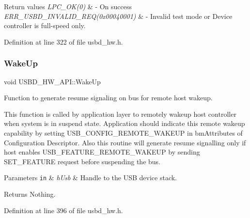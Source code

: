 \begin{DoxyRetVals}{Return values}
{\em L\+P\+C\+\_\+\+O\+K(0)} & -\/ On success \\
\hline
{\em E\+R\+R\+\_\+\+U\+S\+B\+D\+\_\+\+I\+N\+V\+A\+L\+I\+D\+\_\+\+R\+E\+Q(0x00040001)} & -\/ Invalid test mode or Device controller is full-\/speed only. \\
\hline
\end{DoxyRetVals}


Definition at line 322 of file usbd\+\_\+hw.\+h.

\mbox{\label{struct_u_s_b_d___h_w___a_p_i_aaf44f0d6be8e7e49782addd889cc7b98}} 
\subsubsection{\texorpdfstring{Wake\+Up}{WakeUp}}
{\footnotesize\ttfamily void U\+S\+B\+D\+\_\+\+H\+W\+\_\+\+A\+P\+I\+::\+Wake\+Up}

Function to generate resume signaling on bus for remote host wakeup.

This function is called by application layer to remotely wakeup host controller when system is in suspend state. Application should indicate this remote wakeup capability by setting U\+S\+B\+\_\+\+C\+O\+N\+F\+I\+G\+\_\+\+R\+E\+M\+O\+T\+E\+\_\+\+W\+A\+K\+E\+UP in bm\+Attributes of Configuration Descriptor. Also this routine will generate resume signalling only if host enables U\+S\+B\+\_\+\+F\+E\+A\+T\+U\+R\+E\+\_\+\+R\+E\+M\+O\+T\+E\+\_\+\+W\+A\+K\+E\+UP by sending S\+E\+T\+\_\+\+F\+E\+A\+T\+U\+RE request before suspending the bus.


\begin{DoxyParams}[1]{Parameters}
\mbox{\tt in}  & {\em h\+Usb} & Handle to the U\+SB device stack. \\
\hline
\end{DoxyParams}
\begin{DoxyReturn}{Returns}
Nothing. 
\end{DoxyReturn}


Definition at line 396 of file usbd\+\_\+hw.\+h.

\mbox{\label{struct_u_s_b_d___h_w___a_p_i_a9b6402065d4944bbd58235202fbd979f}} 
